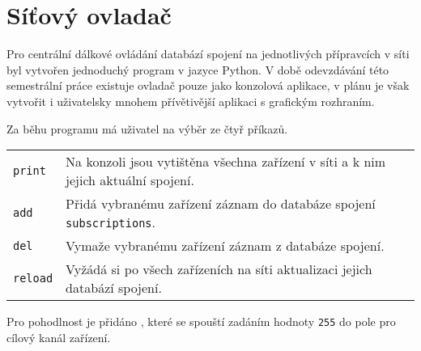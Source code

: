 \chapter{Síťový ovladač}
Pro centrální dálkové ovládání databází spojení na jednotlivých přípravcích v síti byl vytvořen jednoduchý program v jazyce Python. V době odevzdávání této semestrální práce existuje ovladač pouze jako konzolová aplikace, v plánu je však vytvořit i uživatelsky mnohem přívětivější aplikaci s grafickým rozhraním.

\begin{figure}[h]
    \caption{}
    \label{fig:Driver_1}
\end{figure}

Za běhu programu má uživatel na výběr ze čtyř příkazů.
\begin{table}[h]
    \centering
        \begin{tabular}{l p{}}
            \texttt{print} & Na konzoli jsou vytištěna všechna zařízení v síti a k nim jejich aktuální spojení. \\
            \texttt{add} & Přidá vybranému zařízení záznam do databáze spojení \texttt{subscriptions}. \\
            \texttt{del} & Vymaže vybranému zařízení záznam z databáze spojení. \\
            \texttt{reload} & Vyžádá si po všech zařízeních na síti aktualizaci jejich databází spojení. \\
        \end{tabular}
\end{table}

Pro pohodlnost je přidáno , které se spouští zadáním hodnoty \texttt{255} do pole pro cílový kanál zařízení.
